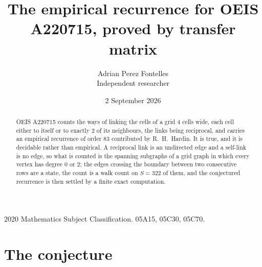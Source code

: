 \documentclass[11pt,a4paper]{article}
\title{The empirical recurrence for OEIS A220715, proved by transfer matrix}
\author{Adrian Perez Fontelles\\ \small Independent researcher}
\date{2 September 2026}
\theoremstyle{plain}
\theoremstyle{definition}
\begin{document}
\maketitle

\begin{abstract}
OEIS A220715 counts the ways of linking the cells of a grid $4$ cells wide, each cell either to
itself or to exactly $2$ of its neighbours, the links being reciprocal, and carries an
empirical recurrence of order $83$ contributed by R.~H.~Hardin. It is true, and it is
decidable rather than empirical. A reciprocal link is an undirected edge and a self-link is
no edge, so what is counted is the spanning subgraphs of a grid graph in which every vertex
has degree $0$ or $2$; the edges crossing the boundary between two consecutive rows are a
state, the count is a walk count on $S=322$ of them, and the conjectured recurrence is then
settled by a finite exact computation.
\end{abstract}

\noindent\small 2020 Mathematics Subject Classification. 05A15, 05C30, 05C70.\normalsize

\section{The conjecture}
\end{document}
